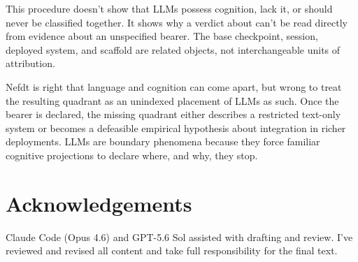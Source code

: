 \documentclass[12pt]{article}
\begin{document}
This procedure doesn't show that LLMs possess cognition, lack it, or should never be classified together. It shows why a verdict about  can't be read directly from evidence about an unspecified bearer. The base checkpoint, session, deployed system, and scaffold are related objects, not interchangeable units of attribution.

Nefdt is right that language and cognition can come apart, but wrong to treat the resulting quadrant as an unindexed placement of LLMs as such. Once the bearer is declared, the missing quadrant either describes a restricted text-only system or becomes a defeasible empirical hypothesis about integration in richer deployments. LLMs are boundary phenomena because they force familiar cognitive projections to declare where, and why, they stop.

\section*{Acknowledgements}

Claude Code (Opus 4.6) and GPT-5.6 Sol assisted with drafting and review. I've reviewed and revised all content and take full responsibility for the final text.

\clearpage
\printbibliography
\end{document}
